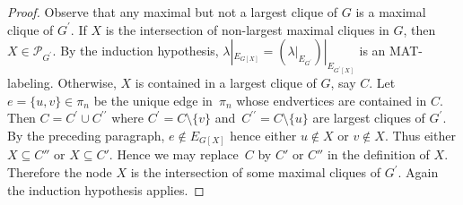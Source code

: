 \begin{proof}
 


Observe that any maximal but not a largest clique of $ G $ is a maximal clique of $ G^{\prime} $. 
If $X$ is the intersection of non-largest maximal cliques in $G$, then $ X \in \mathcal{P}_{G^{\prime}} $.
By the induction hypothesis, $ \lambda|_{E_{G[X]}} = \left(\lambda|_{E_{G^{\prime}}}\right)|_{E_{G^{\prime}[X]}} $ is an MAT-labeling.
Otherwise, $X$ is contained in a largest clique of $G$, say $C$.
Let $e=\{u,v\} \in\pi_n$ be the unique edge in~$\pi_n$ whose endvertices are contained in $C$. 
 Then $ C = C^{\prime} \cup C^{\prime\prime}  $ where $ C^{\prime} = C \setminus  \{v\}$ and~$ C^{\prime\prime} = C \setminus  \{u\} $ are largest cliques of $ G^{\prime} $. 
 By the preceding paragraph, $e \notin E_{G[X]}$ hence either $u \notin X$ or $v \notin X$. 
 Thus either $X \subseteq C''$ or $X \subseteq C'$.
Hence we may replace~$C$ by $C'$ or $C''$ in the definition of $X$.
Therefore the node $ X $ is the intersection of some maximal cliques of $ G^{\prime} $. 
Again the  induction hypothesis applies. 
\end{proof}



